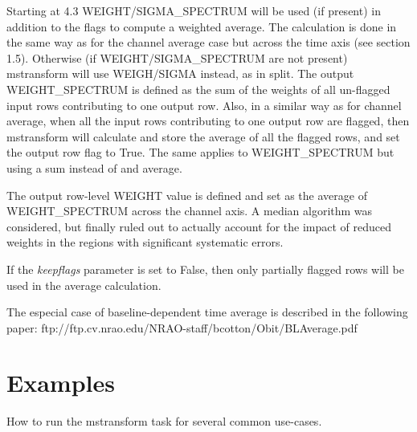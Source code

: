 Starting at 4.3 WEIGHT/SIGMA\_SPECTRUM will be used (if present) in
addition to the flags to compute a weighted average. The calculation is done
in the same way as for the channel average case but across the time axis (see
section 1.5). Otherwise (if WEIGHT/SIGMA\_SPECTRUM are not present)
mstransform will use WEIGH/SIGMA instead, as in split.
The output WEIGHT\_SPECTRUM is defined as the sum of the weights of
all un-flagged input rows contributing to one output row.
Also, in a similar way as for channel average, when all the input rows
contributing to one output row are flagged, then mstransform will calculate
and store the average of all the flagged rows, and set the output row flag to
True. The same applies to WEIGHT\_SPECTRUM but using a sum instead
of and average.

The output row-level WEIGHT value is defined and set as the average of
WEIGHT\_SPECTRUM across the channel axis. A median algorithm was
considered, but finally ruled out to actually account for the impact of
reduced weights in the regions with significant systematic errors.

If the {\it keepflags} parameter is set to False, then only partially flagged
rows will be used in the average calculation. 

The especial case of baseline-dependent time average is described in the
following paper: ftp://ftp.cv.nrao.edu/NRAO-staff/bcotton/Obit/BLAverage.pdf



\section{Examples}\label{Sec:Examples}
How to run the mstransform task for several common use-cases.

